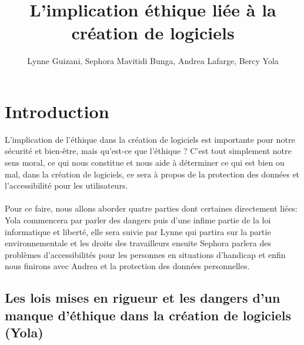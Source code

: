 \documentclass{article}
\title{L'implication éthique liée à la création de logiciels}
\author{Lynne Guizani, Sephora Mavitidi Bunga, Andrea Lafarge, Bercy Yola}
\begin{document}
\maketitle

\section{Introduction}
L'implication de l'éthique dans la création de logiciels est importante pour notre sécurité et bien-être, mais qu'est-ce que l'éthique ? C'est tout simplement notre sens moral, ce qui nous constitue et nous aide à déterminer ce qui est bien ou mal, dans la création de logiciels, ce sera à propos de la protection des données et l'accessibilité pour les utilisateurs.
\\\\
Pour ce faire, nous allons aborder quatre parties dont certaines directement liées:
Yola commencera par parler des dangers puis d'une infime partie de la loi informatique et liberté, elle sera suivie par Lynne qui partira sur la partie environnementale et les droits des travailleurs ensuite Sephora parlera des problèmes d'accessibilités pour les personnes en situations d'handicap et enfin nous finirons avec Andrea et la protection des données personnelles. 


\subsection{Les lois mises en rigueur et les dangers d'un manque d'éthique dans la création de logiciels (Yola)}
\end{document}
